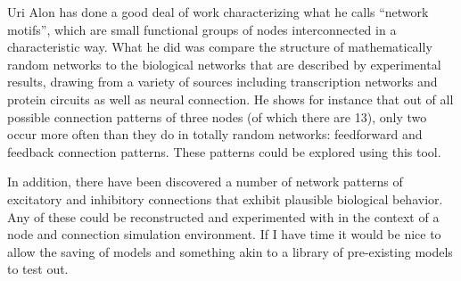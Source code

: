 \documentclass[12pt]{article}
\begin{document}
Uri Alon \cite{Alon} has done a good deal of work characterizing what he calls ``network motifs'', which are small functional groups of nodes interconnected in a characteristic way.  What he did was compare the structure of mathematically random networks to the biological networks that are described by experimental results, drawing from a variety of sources including transcription networks and protein circuits as well as neural connection.  He shows for instance that out of all possible connection patterns of three nodes (of which there are 13), only two occur more often than they do in totally random networks: feedforward and feedback connection patterns.  These patterns could be explored using this tool.  

In addition, there have been discovered a number of network patterns of excitatory and inhibitory connections that exhibit plausible biological behavior.  Any of these could be reconstructed and experimented with in the context of a node and connection simulation environment.  If I have time it would be nice to allow the saving of models and something akin to a library of pre-existing models to test out. 



\end{document}
